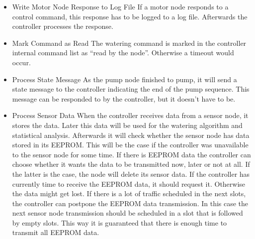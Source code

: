 \documentclass{article}
\begin{document}
\begin{itemize}
	\item Write Motor Node Response to Log File
		If a motor node responds to a control command, this response has to be logged to a log file. Afterwards the controller processes the response.
	\item Mark Command as Read
		The watering command is marked in the controller internal command list as ``read by the node''. Otherwise a timeout would occur.
		
	\item Process State Message
		As the pump node finished to pump, it will send a state message to the controller indicating the end of the pump sequence. This message can be responded to by the controller, but it doesn't have to be.
		
	\item Process Sensor Data
		When the controller receives data from a sensor node, it stores the data. Later this data will be used for the watering algorithm and statistical analysis. Afterwards it will check whether the sensor node has data stored in its EEPROM. This will be the case if the controller was unavailable to the sensor node for some time. If there is EEPROM data the controller can choose whether it wants the data to be transmitted now, later or not at all. If the latter is the case, the node will delete its sensor data. If the controller has currently time to receive the EEPROM data, it should request it. Otherwise the data might get lost. If there is a lot of traffic scheduled in the next slots, the controller can postpone the EEPROM data transmission. In this case the next sensor node transmission should be scheduled in a slot that is followed by empty slots. This way it is guaranteed that there is enough time to transmit all EEPROM data.
	
\end{itemize}
\end{document}
